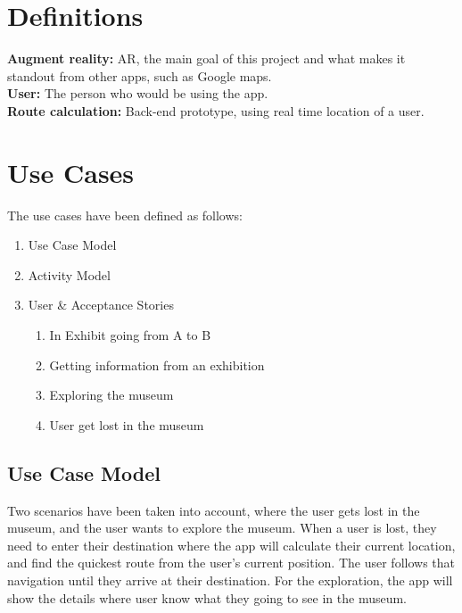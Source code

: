 
\section{Definitions}
\textbf{Augment reality:} AR, the main goal of this project and what makes it standout from other apps, such as Google maps.\newline \\
\textbf{User:} The person who would be using the app. \newline \\
\textbf{Route calculation:} Back-end prototype, using real time location of a user. \newline \\

\section{Use Cases}
The use cases have been defined as follows:
\begin{enumerate}
    \item Use Case Model
    \item Activity Model
    \item User \& Acceptance Stories
    \begin{enumerate}
        \item In Exhibit going from A to B
        \item Getting information from an exhibition
        \item Exploring the museum
        \item User get lost in the museum
    \end{enumerate}
\end{enumerate}

\newpage
\subsection{Use Case Model}
Two scenarios have been taken into account, where the user gets lost in the museum, and the user wants to explore the museum. When a user is lost, they need to enter their destination where the app will calculate their current location, and find the quickest route from the user's current position. The user follows that navigation until they arrive at their destination. For the exploration, the app will show the details where user know what they going to see in the museum.

